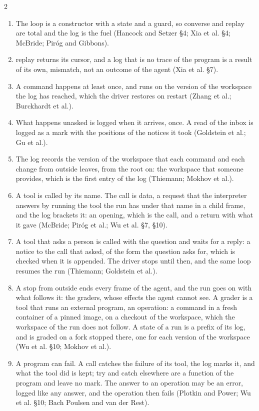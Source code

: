 \documentclass{article}
\newcommand{\topic}[1]{\par\medskip{\bfseries\normalsize #1}\par\smallskip}
\newcommand{\cd}[1]{{\ttfamily #1}}
\begin{document}
\begin{multicols}{2}
\topic{What the sketch takes}

\begin{enumerate}\setlength{\itemsep}{1pt}\setlength{\leftskip}{-0.6em}
\item The loop is a constructor with a state and a guard, so \cd{converse} and \cd{replay} are
  total and the log is the fuel (Hancock and Setzer \S4; Xia et al. \S4; McBride; Pir\'og and
  Gibbons).
\item \cd{replay} returns its cursor, and a log that is no trace of the program is a result of its
  own, \cd{mismatch}, not an outcome of the agent (Xia et al. \S7).
\item A command happens at least once, and runs on the version of the workspace the log has
  reached, which the driver restores on restart (Zhang et al.; Burckhardt et al.).
\item What happens unasked is logged when it arrives, once. A read of the \cd{inbox} is logged
  as a mark with the positions of the notices it took (Goldstein et al.; Gu et al.).
\item The log records the version of the workspace that each command and each change from
  outside leaves, from the root on: the workspace that someone provides, which is the first
  entry of the log (Thiemann; Mokhov et al.).
\item A tool is called by its name. The call is data, a request that the interpreter answers by
  running the tool the run has under that name in a child frame, and the log brackets it: an
  opening, which is the call, and a return with what it gave (McBride; Pir\'og et al.; Wu et al.
  \S7, \S10).
\item A tool that asks a person is called with the question and waits for a reply: a notice to
  the call that asked, of the form the question asks for, which is checked when it is appended.
  The driver stops until then, and the same loop resumes the run (Thiemann; Goldstein et al.).
\item A stop from outside ends every frame of the agent, and the run goes on with what follows
  it: the graders, whose effects the agent cannot see. A grader is a tool that runs an external
  program, an operation: a command in a fresh container of a pinned image, on a checkout of
  the workspace, which the workspace of the run does not follow. A state of a run is a prefix
  of its log, and is graded on a fork stopped there, one for each version of the workspace (Wu et al.
  \S10; Mokhov et al.).
\item A program can fail. A call catches the failure of its tool, the log marks it, and what the
  tool did is kept; \cd{try} and \cd{catch} elsewhere are a function of the program and leave
  no mark. The answer to an operation may be an error, logged like any answer, and the operation
  then fails (Plotkin and Power; Wu et al. \S10; Bach Poulsen and van der Rest).
\end{enumerate}


\end{multicols}
\end{document}
